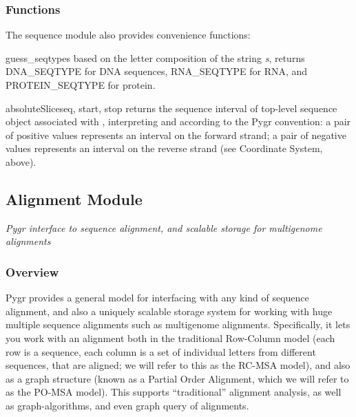 \documentclass{howto}
\begin{document}
\subsubsection{Functions}
The sequence module also provides convenience functions:

\begin{funcdesc}{guess_seqtype}{s}
  based on the letter composition of
  the string {\em s}, returns DNA_SEQTYPE for DNA sequences, 
  RNA_SEQTYPE for RNA, and PROTEIN_SEQTYPE for protein.
\end{funcdesc}

\begin{funcdesc}{absoluteSlice}{seq, start, stop}
  returns the sequence interval of top-level sequence object associated
  with , interpreting  and  according to
  the Pygr convention: a pair of positive values represents an interval
  on the forward strand; a pair of negative values represents an
  interval on the reverse strand (see Coordinate System, above).
\end{funcdesc}




\subsection{Alignment Module}
\label{seqdb}

{\em Pygr interface to sequence alignment, and scalable storage for multigenome alignments}


\subsubsection{Overview}

Pygr provides a general model for interfacing with any kind of sequence alignment,
and also a uniquely scalable storage system for working with huge multiple sequence
alignments such as multigenome alignments.  Specifically, it lets you work with
an alignment both in the traditional Row-Column model (each row is a sequence, each
column is a set of individual letters from different sequences, that are aligned;
we will refer to this as the RC-MSA model), and also
as a graph structure (known as a Partial Order Alignment, which we will refer to as
the PO-MSA model).  This supports ``traditional'' alignment analysis, as well
as graph-algorithms, and even graph query of alignments.
\end{document}

